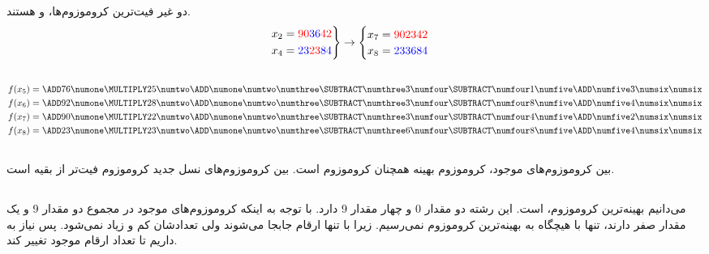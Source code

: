 \documentclass{university}
\begin{document}
\subsubsection{}
دو غیر فیت‌ترین کروموزوم‌ها، 
و 
هستند. 
\begin{gather*}
    \begin{drcases}
        x_2 = {\color{red}90} {\color{blue}36} {\color{red}42} \\
        x_4 = {\color{blue}23} {\color{red}23} {\color{blue}84}
    \end{drcases} \rightarrow
    \begin{cases}
        x_7 = {\color{red}90} {\color{red}23} {\color{red}42} \\
        x_8 = {\color{blue}23} {\color{blue}36} {\color{blue}84}
    \end{cases}
\end{gather*}

\subsection{}
\begin{gather*}
    f(x_5) = \f{7}{6}{5}{3}{1}{3} \\
    f(x_6) = \f{9}{2}{8}{3}{8}{4} \\
    f(x_7) = \f{9}{0}{2}{3}{4}{2} \\
    f(x_8) = \f{2}{3}{3}{6}{8}{4}
\end{gather*}

\subsection{}
بین کروموزوم‌های موجود، کروموزوم بهینه همچنان کروموزوم 
است. بین کروموزوم‌های نسل جدید کروموزوم 
فیت‌تر از بقیه است.

\subsection{}
می‌دانیم بهینه‌ترین کروموزوم، 
است. این رشته دو مقدار 0 و چهار مقدار 9 دارد. با توجه به اینکه کروموزوم‌های موجود در مجموع 
دو مقدار 9 و یک مقدار صفر دارند، تنها با 
هیچگاه به بهینه‌ترین کروموزوم نمی‌رسیم. زیرا با 
تنها ارقام جابجا می‌شوند ولی تعدادشان کم و زیاد نمی‌شود. پس نیاز به 
داریم تا تعداد ارقام موجود تغییر کند. 
\end{document}
